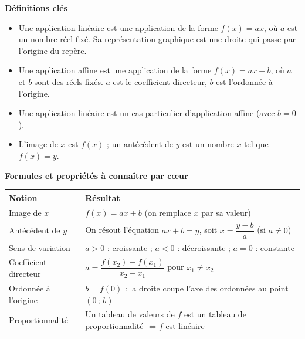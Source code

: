 \documentclass[11pt]{article}
\newcommand{\cle}[1]{{\popxbold\color{popdark}#1}}
\begin{document}
\begin{bilan}
\textbf{Définitions clés}
\begin{itemize}
  \item Une \cle{application linéaire} est une application de la forme $f(x)=ax$, où $a$ est un nombre réel fixé. Sa représentation graphique est une droite qui passe par l'\cle{origine} du repère.
  \item Une \cle{application affine} est une application de la forme $f(x)=ax+b$, où $a$ et $b$ sont des réels fixés. $a$ est le \cle{coefficient directeur}, $b$ est l'\cle{ordonnée à l'origine}.
  \item Une application linéaire est un cas particulier d'application affine (avec $b=0$).
  \item L'\cle{image} de $x$ est $f(x)$ ; un \cle{antécédent} de $y$ est un nombre $x$ tel que $f(x)=y$.
\end{itemize}

\textbf{Formules et propriétés à connaître par cœur}
\begin{center}
\begin{tabularx}{\linewidth}{|l|X|}\hline
\rowcolor{popblueL} \textbf{Notion} & \textbf{Résultat} \\ \hline
Image de $x$ & $f(x)=ax+b$ (on remplace $x$ par sa valeur) \\ \hline
Antécédent de $y$ & On résout l'équation $ax+b=y$, soit $x=\dfrac{y-b}{a}$ (si $a\neq 0$) \\ \hline
Sens de variation & $a>0$ : croissante ; $a<0$ : décroissante ; $a=0$ : constante \\ \hline
Coefficient directeur & $a=\dfrac{f(x_2)-f(x_1)}{x_2-x_1}$ pour $x_1\neq x_2$ \\ \hline
Ordonnée à l'origine & $b=f(0)$ : la droite coupe l'axe des ordonnées au point $(0\,;\,b)$ \\ \hline
Proportionnalité & Un tableau de valeurs de $f$ est un tableau de proportionnalité $\iff f$ est linéaire \\ \hline
\end{tabularx}
\end{center}


\end{bilan}
\end{document}
